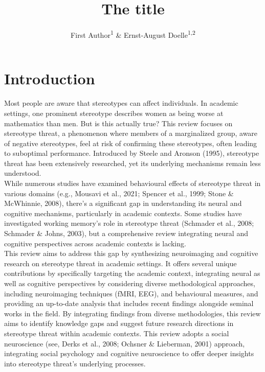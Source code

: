 \documentclass[
  stu, a4paper,floatsintext]{apa7}
\title{The title}
\author{First Author\textsuperscript{1} \& Ernst-August Doelle\textsuperscript{1,2}}
\date{}
\affiliation{\vspace{0.5cm}\textsuperscript{1} Wilhelm-Wundt-University\\\textsuperscript{2} Konstanz Business School}
\begin{document}
\maketitle

{
\setcounter{tocdepth}{3}
\tableofcontents
}
\section{Introduction}\label{introduction}

Most people are aware that stereotypes can affect individuals. In academic settings, one prominent stereotype describes women as being worse at mathematics than men. But is this actually true? This review focuses on stereotype threat, a phenomenon where members of a marginalized group, aware of negative stereotypes, feel at risk of confirming these stereotypes, often leading to suboptimal performance. Introduced by Steele and Aronson (1995), stereotype threat has been extensively researched, yet its underlying mechanisms remain less understood.\\
While numerous studies have examined behavioural effects of stereotype threat in various domains (e.g., Mousavi et al., 2021; Spencer et al., 1999; Stone \& McWhinnie, 2008), there's a significant gap in understanding its neural and cognitive mechanisms, particularly in academic contexts. Some studies have investigated working memory's role in stereotype threat (Schmader et al., 2008; Schmader \& Johns, 2003), but a comprehensive review integrating neural and cognitive perspectives across academic contexts is lacking.\\
This review aims to address this gap by synthesizing neuroimaging and cognitive research on stereotype threat in academic settings.
It offers several unique contributions by specifically targeting the academic context, integrating neural as well as cognitive perspectives by considering diverse methodological approaches, including neuroimaging techniques (fMRI, EEG), and behavioural measures, and providing an up-to-date analysis that includes recent findings alongside seminal works in the field.
By integrating findings from diverse methodologies, this review aims to identify knowledge gaps and suggest future research directions in stereotype threat within academic contexts.
This review adopts a social neuroscience (see, Derks et al., 2008; Ochsner \& Lieberman, 2001) approach, integrating social psychology and cognitive neuroscience to offer deeper insights into stereotype threat's underlying processes.\\
\end{document}

